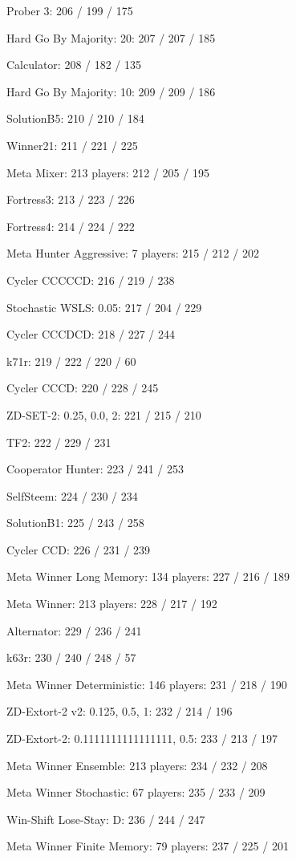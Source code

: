 \item Prober 3: 206 / 199 / 175
\item Hard Go By Majority: 20: 207 / 207 / 185
\item Calculator: 208 / 182 / 135
\item Hard Go By Majority: 10: 209 / 209 / 186
\item SolutionB5: 210 / 210 / 184
\item Winner21: 211 / 221 / 225
\item Meta Mixer: 213 players: 212 / 205 / 195
\item Fortress3: 213 / 223 / 226
\item Fortress4: 214 / 224 / 222
\item Meta Hunter Aggressive: 7 players: 215 / 212 / 202
\item Cycler CCCCCD: 216 / 219 / 238
\item Stochastic WSLS: 0.05: 217 / 204 / 229
\item Cycler CCCDCD: 218 / 227 / 244
\item k71r: 219 / 222 / 220 / 60
\item Cycler CCCD: 220 / 228 / 245
\item ZD-SET-2: 0.25, 0.0, 2: 221 / 215 / 210
\item TF2: 222 / 229 / 231
\item Cooperator Hunter: 223 / 241 / 253
\item SelfSteem: 224 / 230 / 234
\item SolutionB1: 225 / 243 / 258
\item Cycler CCD: 226 / 231 / 239
\item Meta Winner Long Memory: 134 players: 227 / 216 / 189
\item Meta Winner: 213 players: 228 / 217 / 192
\item Alternator: 229 / 236 / 241
\item k63r: 230 / 240 / 248 / 57
\item Meta Winner Deterministic: 146 players: 231 / 218 / 190
\item ZD-Extort-2 v2: 0.125, 0.5, 1: 232 / 214 / 196
\item ZD-Extort-2: 0.1111111111111111, 0.5: 233 / 213 / 197
\item Meta Winner Ensemble: 213 players: 234 / 232 / 208
\item Meta Winner Stochastic: 67 players: 235 / 233 / 209
\item Win-Shift Lose-Stay: D: 236 / 244 / 247
\item Meta Winner Finite Memory: 79 players: 237 / 225 / 201

